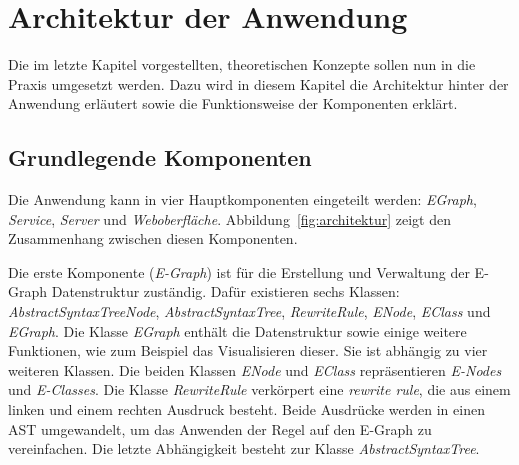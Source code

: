 \section{Architektur der Anwendung}\label{sec:architektur}

Die im letzte Kapitel vorgestellten, theoretischen Konzepte sollen nun in die Praxis umgesetzt werden.
Dazu wird in diesem Kapitel die Architektur hinter der Anwendung erläutert sowie die Funktionsweise der Komponenten erklärt.

\subsection{Grundlegende Komponenten}

Die Anwendung kann in vier Hauptkomponenten eingeteilt werden: \textit{EGraph}, \textit{Service}, \textit{Server} und \textit{Weboberfläche}.
Abbildung~\ref{fig:architektur} zeigt den Zusammenhang zwischen diesen Komponenten. 



Die erste Komponente (\textit{E-Graph}) ist für die Erstellung und Verwaltung der E-Graph Datenstruktur zuständig. Dafür existieren sechs Klassen:
\textit{AbstractSyntaxTreeNode}, \textit{AbstractSyntaxTree}, \textit{RewriteRule}, \textit{ENode}, \textit{EClass} und \textit{EGraph}.
Die Klasse \textit{EGraph} enthält die Datenstruktur sowie einige weitere Funktionen, wie zum Beispiel das Visualisieren dieser.
Sie ist abhängig zu vier weiteren Klassen. Die beiden Klassen \textit{ENode} und \textit{EClass} repräsentieren \textit{E-Nodes} und \textit{E-Classes}.
Die Klasse \textit{RewriteRule} verkörpert eine \textit{rewrite rule}, die aus einem linken und einem rechten Ausdruck besteht. Beide Ausdrücke werden in einen AST umgewandelt, 
um das Anwenden der Regel auf den E-Graph zu vereinfachen.
Die letzte Abhängigkeit besteht zur Klasse \textit{AbstractSyntaxTree}.



